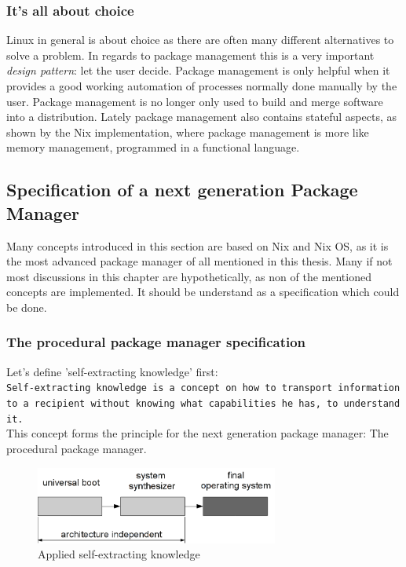 \documentclass[a4paper,10pt]{article}
\begin{document}
\subsubsection*{It's all about choice}
Linux in general is about choice as there are often many different alternatives to solve a problem. In regards to package management this is a very important \textit{design pattern}: let the user decide. Package management is only helpful when it provides a good working automation of processes normally done manually by the user. Package management is no longer only used to build and merge software into a distribution. Lately package management also contains stateful aspects, as shown by the Nix implementation, where package management is more like memory management, programmed in a functional language.




\newpage
\subsection{Specification of a next generation Package Manager}
Many concepts introduced in this section are based on Nix and Nix OS, as it is the most advanced package manager of all mentioned in this thesis. Many if not most discussions in this chapter are hypothetically, as non of the mentioned concepts are implemented. It should be understand as a specification which could be done.

\subsubsection{The procedural package manager specification}
\label{proceduralpackagemanagement}

Let's define 'self-extracting knowledge' first:\\
\texttt{Self-extracting knowledge is a concept on how to transport information to a recipient without knowing what capabilities he has, to understand it.}\\

This concept forms the principle for the next generation package manager: The procedural package manager.

\begin{figure}[h]
\caption[Package management]{Applied self-extracting knowledge}
  \centering
\label{fig:Selfextractingknowledge}
\includegraphics[width=80mm]{diagrams/self-extracting-knowledge.png}
\end{figure}
\end{document}
